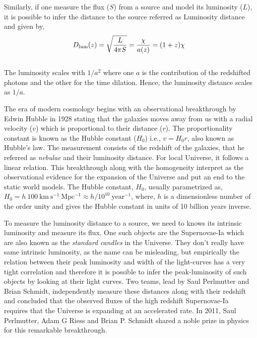 Similarly, if one measure the flux ($S$) from a source and model its luminosity ($L$), it is
possible to infer the distance to the source referred as Luminosity distance and 
given by,
\begin{equation}
	D_{\rm lum}(z) = \sqrt{\dfrac{L}{4\pi S}} = \dfrac{\chi}{a(z)} = (1+z)\chi
\end{equation}
\\
The luminosity scales with $1/a^2$ where one $a$ is the contribution of the redshifted
photons and the other for the time dilation. Hence, the luminosity distance scales
as $1/a$.

The era of modern cosmology begins with an observational breakthrough by Edwin Hubble 
in 1928 stating that the galaxies moves away from us with a radial velocity ($v$) which
is proportional to their distance ($r$). The proportionality constant is known
as the Hubble constant ($H_0$) i.e., $v=H_0 r$, also known as Hubble's law. 
The measurement consists of the redshift of the galaxies, that he referred as
{\it nebulae} and their luminosity distance. For local Universe, it follows
a linear relation. 
This breakthrough along with the
homogeneity interpret as the observational evidence for the expansion of the Universe and
put an end to the static world models. The Hubble constant, $H_0$, usually parametrized as, 
$H_0 = h\ 100\ \mathrm{km\ s^{-1}\ Mpc^{-1}} \approx h/10^{10}\ \mathrm{year^{-1}}$,
where, $h$ is a dimensionless number of the order unity and gives the 
Hubble constant in units of 10 billion years inverse. 

To measure the luminosity distance to a source, we need to 
knows its intrinsic luminosity and measure its flux. One such objects are the
Supernovae-Ia which are also known as the {\it standard candles} in the Universe. They
don't really have same intrinsic luminosity, as the name can be misleading, but 
empirically the relation between their peak luminosity and width of the light-curves
has a very tight correlation and therefore it is possible to infer the peak-luminosity
of such objects by looking at their light curves. Two teams, lead by Saul Perlmutter and
Brian Schmidt, independently measure these distances along with their redshift and
concluded that the observed fluxes of the high redshift Supernovae-Ia requires that
the Universe is expanding at an accelerated rate. In 2011, Saul Perlmutter, Adam G Riess and
Brian P. Schmidt shared a noble prize in physics for this remarkable breakthrough. 




